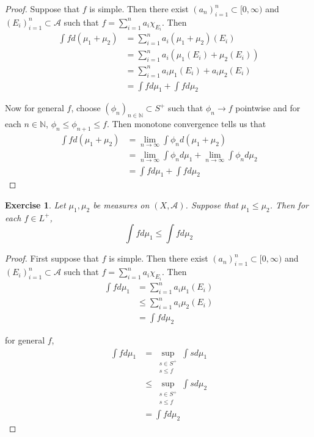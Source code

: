 \documentclass[12pt]{amsart}
\newtheorem{ex}[thm]{Exercise}
\newcommand{\N}{\mathbb{N}}
\newcommand{\MA}{\mathcal{A}}
\newcommand{\Rg}{[0,\infty)}
\newcommand{\limn}{\lim \limits_{n \rightarrow \infty}}
\begin{document}
\begin{proof}
Suppose that $f$ is simple. Then there exist $(a_n)_{i=1}^n \subset \Rg$ and $(E_i)_{i=1}^n \subset \MA$ such that $f = \sum\limits_{i =1}^n a_i \chi_{E_i}$. Then 
\begin{align*}
\int f d(\mu_1 + \mu_2) 
&= \sum\limits_{i =1}^n a_i (\mu_1 + \mu_2)(E_i)\\
&= \sum\limits_{i =1}^n a_i (\mu_1(E_i) + \mu_2(E_i))\\
&= \sum\limits_{i =1}^n a_i \mu_1(E_i) + a_i \mu_2(E_i)\\
&= \int f d\mu_1 + \int f d\mu_2
\end{align*}

Now for general $f$, choose $(\phi_n)_{n \in \N} \subset S^+$ such that $\phi_n \rightarrow f$ pointwise and for each $n \in \N$, $\phi_n \leq \phi_{n+1} \leq f$. Then monotone convergence tells us that 
\begin{align*}
\int f d(\mu_1 + \mu_2) 
&= \limn \int \phi_n d(\mu_1 + \mu_2)\\
&= \limn \int \phi_n d \mu_1 + \limn \int \phi_n d \mu_2 \\
&= \int f d \mu_1 + \int f d \mu_2
\end{align*}

\end{proof}


\begin{ex}
Let $\mu_1, \mu_2$ be measures on $(X,\MA)$. Suppose that $\mu_1 \leq \mu_2$. Then for each $f \in L^+$, $$\int f d\mu_1 \leq \int f d\mu_2$$
\end{ex}

\begin{proof}
First suppose that $f$ is simple. Then there exist $(a_n)_{i=1}^n \subset \Rg$ and $(E_i)_{i=1}^n \subset \MA$ such that $f = \sum\limits_{i =1}^n a_i \chi_{E_i}$. Then 
\begin{align*}
\int f d\mu_1 
&= \sum\limits_{i =1}^n a_i \mu_1(E_i)\\
& \leq \sum\limits_{i =1}^n a_i \mu_2(E_i)\\
&= \int f d \mu_2
\end{align*} 

for general $f$, 
\begin{align*}
\int f d\mu_1 
&= \sup_{\substack{s \in S^+\\s \leq f}} \int s d \mu_1 \\
& \leq \sup_{\substack{s \in S^+\\s \leq f}} \int s d\mu_2\\
&= \int f d\mu_2
\end{align*}

\end{proof}
\end{document}
